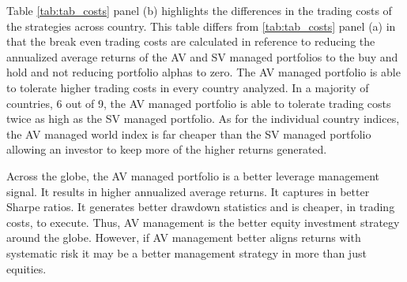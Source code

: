 %
%


Table \ref{tab:tab_costs} panel (b) highlights the differences in the trading costs of the strategies across country. This table differs from \ref{tab:tab_costs} panel (a) in that the break even trading costs are calculated in reference to reducing the annualized average returns of the AV and SV managed portfolios to the buy and hold and not reducing portfolio alphas to zero. The AV managed portfolio is able to tolerate higher trading costs in every country analyzed. In a majority of countries, 6 out of 9, the AV managed portfolio is able to tolerate trading costs twice as high as the SV managed portfolio. As for the individual country indices, the AV managed world index is far cheaper than the SV managed portfolio allowing an investor to keep more of the higher returns generated.
%

Across the globe, the AV managed portfolio is a better leverage management signal. It results in higher annualized average returns. It captures in better Sharpe ratios. It generates better drawdown statistics and is cheaper, in trading costs, to execute. Thus, AV management is the better equity investment strategy around the globe. However, if AV management better aligns returns with systematic risk it may be a better management strategy in more than just equities.
